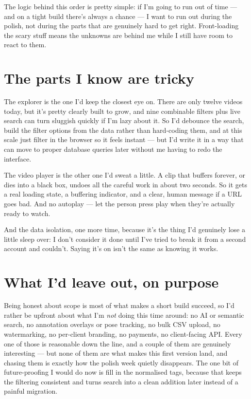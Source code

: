 \documentclass[a4paper,11pt]{article}
\begin{document}
The logic behind this order is pretty simple: if I'm going to run out of time --- and on a tight build there's always a chance --- I want to run out during the polish, not during the parts that are genuinely hard to get right. Front-loading the scary stuff means the unknowns are behind me while I still have room to react to them.

\section{The parts I know are tricky}

The explorer is the one I'd keep the closest eye on. There are only twelve videos today, but it's pretty clearly built to grow, and nine combinable filters plus live search can turn sluggish quickly if I'm lazy about it. So I'd debounce the search, build the filter options from the data rather than hard-coding them, and at this scale just filter in the browser so it feels instant --- but I'd write it in a way that can move to proper database queries later without me having to redo the interface.

The video player is the other one I'd sweat a little. A clip that buffers forever, or dies into a black box, undoes all the careful work in about two seconds. So it gets a real loading state, a buffering indicator, and a clear, human message if a URL goes bad. And no autoplay --- let the person press play when they're actually ready to watch.

And the data isolation, one more time, because it's the thing I'd genuinely lose a little sleep over: I don't consider it done until I've tried to break it from a second account and couldn't. Saying it's on isn't the same as knowing it works.

\section{What I'd leave out, on purpose}

Being honest about scope is most of what makes a short build succeed, so I'd rather be upfront about what I'm \textit{not} doing this time around: no AI or semantic search, no annotation overlays or pose tracking, no bulk CSV upload, no watermarking, no per-client branding, no payments, no client-facing API. Every one of those is reasonable down the line, and a couple of them are genuinely interesting --- but none of them are what makes this first version land, and chasing them is exactly how the polish week quietly disappears. The one bit of future-proofing I would do now is fill in the normalised tags, because that keeps the filtering consistent and turns search into a clean addition later instead of a painful migration.
\end{document}
